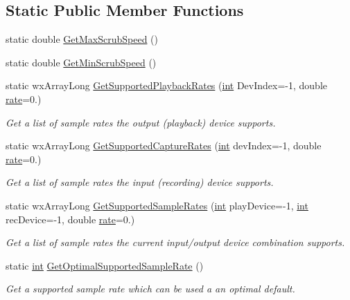 \subsection*{Static Public Member Functions}
\begin{DoxyCompactItemize}
\item 
static double \hyperlink{class_audio_i_o_a377107ccda3176965ac68d757ba517a7}{Get\+Max\+Scrub\+Speed} ()
\item 
static double \hyperlink{class_audio_i_o_a40f26467a7d142f0edea9b3ac893dddd}{Get\+Min\+Scrub\+Speed} ()
\item 
static wx\+Array\+Long \hyperlink{class_audio_i_o_a8d5c6376948069792d356c4d465f65af}{Get\+Supported\+Playback\+Rates} (\hyperlink{xmltok_8h_a5a0d4a5641ce434f1d23533f2b2e6653}{int} Dev\+Index=-\/1, double \hyperlink{seqread_8c_ad89d3fac2deab7a9cf6cfc8d15341b85}{rate}=0.)
\begin{DoxyCompactList}\small\item\em Get a list of sample rates the output (playback) device supports. \end{DoxyCompactList}\item 
static wx\+Array\+Long \hyperlink{class_audio_i_o_a5a038799b288476cf6896129739c0ce5}{Get\+Supported\+Capture\+Rates} (\hyperlink{xmltok_8h_a5a0d4a5641ce434f1d23533f2b2e6653}{int} dev\+Index=-\/1, double \hyperlink{seqread_8c_ad89d3fac2deab7a9cf6cfc8d15341b85}{rate}=0.)
\begin{DoxyCompactList}\small\item\em Get a list of sample rates the input (recording) device supports. \end{DoxyCompactList}\item 
static wx\+Array\+Long \hyperlink{class_audio_i_o_acb6e16f4da1d263491071ce5b26a9abd}{Get\+Supported\+Sample\+Rates} (\hyperlink{xmltok_8h_a5a0d4a5641ce434f1d23533f2b2e6653}{int} play\+Device=-\/1, \hyperlink{xmltok_8h_a5a0d4a5641ce434f1d23533f2b2e6653}{int} rec\+Device=-\/1, double \hyperlink{seqread_8c_ad89d3fac2deab7a9cf6cfc8d15341b85}{rate}=0.)
\begin{DoxyCompactList}\small\item\em Get a list of sample rates the current input/output device combination supports. \end{DoxyCompactList}\item 
static \hyperlink{xmltok_8h_a5a0d4a5641ce434f1d23533f2b2e6653}{int} \hyperlink{class_audio_i_o_a71facd3c7274394b70eaff652e1bc97e}{Get\+Optimal\+Supported\+Sample\+Rate} ()
\begin{DoxyCompactList}\small\item\em Get a supported sample rate which can be used a an optimal default. \end{DoxyCompactList}\item 

\end{DoxyCompactItemize}
